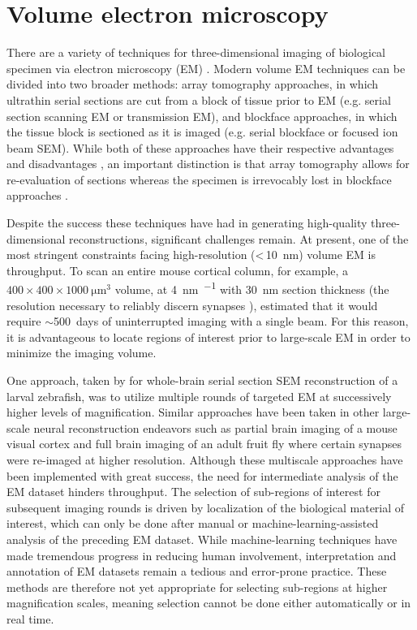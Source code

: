 \section{Volume electron microscopy}
\label{sec:1_vEM}

There are a variety of techniques for three-dimensional imaging of biological specimen via electron microscopy (EM) \cite{peddie2014exploring}. Modern volume EM techniques can be divided into two broader methods: array tomography approaches, in which ultrathin serial sections are cut from a block of tissue prior to EM (e.g. serial section scanning EM or transmission EM), and blockface approaches, in which the tissue block is sectioned as it is imaged (e.g. serial blockface or focused ion beam SEM). While both of these approaches have their respective advantages and disadvantages \cite{briggman2012volume, peddie2014exploring}, an important distinction is that array tomography allows for re-evaluation of sections whereas the specimen is irrevocably lost in blockface approaches \cite{schifferer2021niwaki}.

Despite the success these techniques have had in generating high-quality three-dimensional reconstructions, significant challenges remain. At present, one of the most stringent constraints facing high-resolution (<\,\SI{10}{\nano\meter}) volume EM is throughput. To scan an entire mouse cortical column, for example, a $400 \times 400 \times \SI{1000}{\micro\meter^3}$ volume, at \SI{4}{\nano\meter\per\pixel} with \SI{30}{\nano\meter} section thickness (the resolution necessary to reliably discern synapses \cite{harris1989dendritic, meinertzhagen1991synaptic}), \textcite{briggman2012volume} estimated that it would require ${\sim}$\SI{500}{days} of uninterrupted imaging with a single beam. For this reason, it is advantageous to locate regions of interest prior to large-scale EM in order to minimize the imaging volume.

One approach, taken by \textcite{hildebrand2017whole} for whole-brain serial section SEM reconstruction of a larval zebrafish, was to utilize multiple rounds of targeted EM at successively higher levels of magnification. Similar approaches have been taken in other large-scale neural reconstruction endeavors such as partial brain imaging of a mouse visual cortex \cite{bock2011network} and full brain imaging of an adult fruit fly \cite{zheng2018complete} where certain synapses were re-imaged at higher resolution. Although these multiscale approaches have been implemented with great success, the need for intermediate analysis of the EM dataset hinders throughput. The selection of sub-regions of interest for subsequent imaging rounds is driven by localization of the biological material of interest, which can only be done after manual or machine-learning-assisted analysis of the preceding EM dataset. While machine-learning techniques have made tremendous progress in reducing human involvement, interpretation and annotation of EM datasets remain a tedious and error-prone practice. These methods are therefore not yet appropriate for selecting sub-regions at higher magnification scales, meaning selection cannot be done either automatically or in real time.


